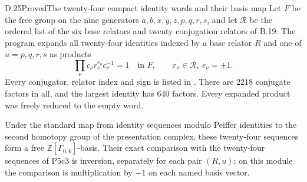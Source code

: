 \begin{result}{D.25}{Proved}{The twenty-four compact identity words and their basis map}
Let $F$ be the free group on the nine generators
$a,b,x,y,z,p,q,r,s$, and let $\mathcal R$ be the ordered
list of the six base relators and twenty conjugation
relators of B.19.  The program
 expands all twenty-four
identities indexed by a base relator $R$ and one of
$u=p,q,r,s$ as products
\[
                  \prod_\nu c_\nu r_\nu^{e_\nu}c_\nu^{-1}=1
                  \quad\text{in }F,\qquad
                  r_\nu\in\mathcal R,\ e_\nu=\pm1.
\]
Every conjugator, relator index and sign is listed in
.  There are $2218$
conjugate factors in all, and the largest identity has
$640$ factors.  Every expanded product was freely reduced
to the empty word.

Under the standard map from identity sequences modulo
Peiffer identities to the second homotopy group of the
presentation complex, these twenty-four sequences form
a free $\mathbb Z[\Gamma_{0,6}]$-basis.  Their exact
comparison with the twenty-four sequences of P5c3 is
inversion, separately for each pair $(R,u)$; on this
module the comparison is multiplication by $-1$ on
each named basis vector.
\end{result}
